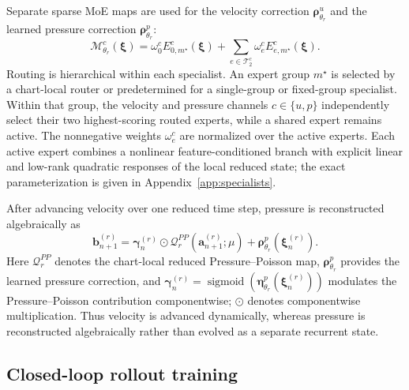 \documentclass{article}
\begin{document}
Separate sparse MoE maps are used for the velocity correction $\bm\rho^u_{\theta_r}$ and the learned pressure correction $\bm\rho^p_{\theta_r}$:
\begin{equation}
  \mathcal M^c_{\theta_r}(\bm\xi)=
  \omega^c_0 E^c_{0,m^\star}(\bm\xi)+
  \sum_{e\in\mathcal T_2^c}\omega^c_e E^c_{e,m^\star}(\bm\xi).
  \label{eq:main_inner_moe}
\end{equation}
Routing is hierarchical within each specialist. An expert group $m^\star$ is selected by a chart-local router or predetermined for a single-group or fixed-group specialist. Within that group, the velocity and pressure channels $c\in\{u,p\}$ independently select their two highest-scoring routed experts, while a shared expert remains active. The nonnegative weights $\omega_e^c$ are normalized over the active experts. Each active expert combines a nonlinear feature-conditioned branch with explicit linear and low-rank quadratic responses of the local reduced state; the exact parameterization is given in Appendix~\ref{app:specialists}.

After advancing velocity over one reduced time step, pressure is reconstructed algebraically as
\begin{equation}
  \bm b_{n+1}^{(r)}
  =\bm\gamma_n^{(r)}\odot\mathcal Q_r^{PP}(\bm a_{n+1}^{(r)};\mu)
  +\bm\rho^p_{\theta_r}(\bm\xi_n^{(r)}).
  \label{eq:main_pressure_closure}
\end{equation}
Here $\mathcal Q_r^{PP}$ denotes the chart-local reduced Pressure--Poisson map, $\bm\rho^p_{\theta_r}$ provides the learned pressure correction, and $\bm\gamma_n^{(r)} =\operatorname{sigmoid}(\bm\eta^p_{\theta_r}(\bm\xi_n^{(r)}))$ modulates the Pressure--Poisson contribution componentwise; $\odot$ denotes componentwise multiplication. Thus velocity is advanced dynamically, whereas pressure is reconstructed algebraically rather than evolved as a separate recurrent state.


\subsection{Closed-loop rollout training}
\end{document}
